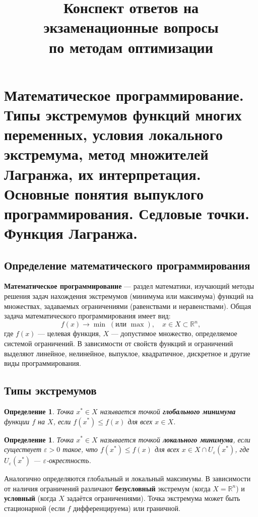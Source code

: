 \documentclass{article}
\title{Конспект ответов на экзаменационные вопросы \\ по методам оптимизации}
\author{}
\date{}
\theoremstyle{plain}
\newtheorem{definition}[theorem]{Определение}
\begin{document}
\maketitle

\section{Математическое программирование. Типы экстремумов функций многих переменных, условия локального экстремума, метод множителей Лагранжа, их интерпретация. Основные понятия выпуклого программирования. Седловые точки. Функция Лагранжа.}

\subsection{Определение математического программирования}
\textbf{Математическое программирование} — раздел математики, изучающий методы решения задач нахождения экстремумов (минимума или максимума) функций на множествах, задаваемых ограничениями (равенствами и неравенствами). Общая задача математического программирования имеет вид:
\[
f(x) \to \min \;(\text{или } \max),\quad x \in X \subset \mathbb{R}^n,
\]
где $f(x)$ — целевая функция, $X$ — допустимое множество, определяемое системой ограничений. В зависимости от свойств функций и ограничений выделяют линейное, нелинейное, выпуклое, квадратичное, дискретное и другие виды программирования.

\subsection{Типы экстремумов}
\begin{definition}
Точка $x^* \in X$ называется точкой \textbf{глобального минимума} функции $f$ на $X$, если $f(x^*) \le f(x)$ для всех $x \in X$.
\end{definition}
\begin{definition}
Точка $x^* \in X$ называется точкой \textbf{локального минимума}, если существует $\varepsilon > 0$ такое, что $f(x^*) \le f(x)$ для всех $x \in X \cap U_\varepsilon(x^*)$, где $U_\varepsilon(x^*)$ — $\varepsilon$-окрестность.
\end{definition}
Аналогично определяются глобальный и локальный максимумы. В зависимости от наличия ограничений различают \textbf{безусловный} экстремум (когда $X = \mathbb{R}^n$) и \textbf{условный} (когда $X$ задаётся ограничениями). Точка экстремума может быть стационарной (если $f$ дифференцируема) или граничной.
\end{document}
